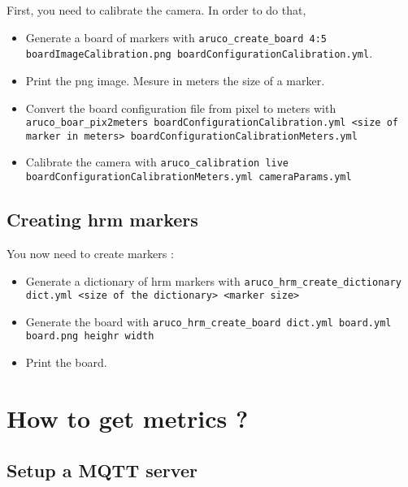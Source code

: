 \documentclass[a4paper,11pt]{report}
\begin{document}
First, you need to calibrate the camera. In order to do that, \begin{itemize}

    \item Generate a board of markers with \texttt{aruco\_create\_board 4:5
        boardImageCalibration.png boardConfigurationCalibration.yml}.

    \item Print the png image. Mesure in meters the size of a marker.

    \item Convert the board configuration file from pixel to meters with
        \texttt{aruco\_boar\_pix2meters boardConfigurationCalibration.yml <size
        of marker in meters> boardConfigurationCalibrationMeters.yml}

    \item Calibrate the camera with \texttt{aruco\_calibration live
        boardConfigurationCalibrationMeters.yml cameraParams.yml}

\end{itemize}

\subsection{Creating hrm markers}

You now need to create markers : \begin{itemize}

    \item Generate a dictionary of hrm markers with
        \texttt{aruco\_hrm\_create\_dictionary dict.yml <size of the
        dictionary> <marker size>}

    \item Generate the board with \texttt{aruco\_hrm\_create\_board dict.yml
        board.yml board.png heighr width}

    \item Print the board.

\end{itemize}



\section{How to get metrics ?} \subsection{Setup a MQTT server}
\end{document}
